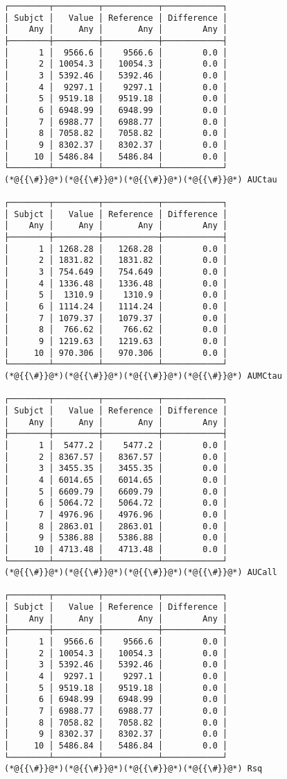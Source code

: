 \documentclass[12pt,a4paper]{article}
\begin{document}
\begin{lstlisting}
┌────────┬─────────┬───────────┬────────────┐
│ Subjct │   Value │ Reference │ Difference │
│    Any │     Any │       Any │        Any │
├────────┼─────────┼───────────┼────────────┤
│      1 │  9566.6 │    9566.6 │        0.0 │
│      2 │ 10054.3 │   10054.3 │        0.0 │
│      3 │ 5392.46 │   5392.46 │        0.0 │
│      4 │  9297.1 │    9297.1 │        0.0 │
│      5 │ 9519.18 │   9519.18 │        0.0 │
│      6 │ 6948.99 │   6948.99 │        0.0 │
│      7 │ 6988.77 │   6988.77 │        0.0 │
│      8 │ 7058.82 │   7058.82 │        0.0 │
│      9 │ 8302.37 │   8302.37 │        0.0 │
│     10 │ 5486.84 │   5486.84 │        0.0 │
└────────┴─────────┴───────────┴────────────┘
(*@{{\#}}@*)(*@{{\#}}@*)(*@{{\#}}@*)(*@{{\#}}@*) AUCtau

┌────────┬─────────┬───────────┬────────────┐
│ Subjct │   Value │ Reference │ Difference │
│    Any │     Any │       Any │        Any │
├────────┼─────────┼───────────┼────────────┤
│      1 │ 1268.28 │   1268.28 │        0.0 │
│      2 │ 1831.82 │   1831.82 │        0.0 │
│      3 │ 754.649 │   754.649 │        0.0 │
│      4 │ 1336.48 │   1336.48 │        0.0 │
│      5 │  1310.9 │    1310.9 │        0.0 │
│      6 │ 1114.24 │   1114.24 │        0.0 │
│      7 │ 1079.37 │   1079.37 │        0.0 │
│      8 │  766.62 │    766.62 │        0.0 │
│      9 │ 1219.63 │   1219.63 │        0.0 │
│     10 │ 970.306 │   970.306 │        0.0 │
└────────┴─────────┴───────────┴────────────┘
(*@{{\#}}@*)(*@{{\#}}@*)(*@{{\#}}@*)(*@{{\#}}@*) AUMCtau

┌────────┬─────────┬───────────┬────────────┐
│ Subjct │   Value │ Reference │ Difference │
│    Any │     Any │       Any │        Any │
├────────┼─────────┼───────────┼────────────┤
│      1 │  5477.2 │    5477.2 │        0.0 │
│      2 │ 8367.57 │   8367.57 │        0.0 │
│      3 │ 3455.35 │   3455.35 │        0.0 │
│      4 │ 6014.65 │   6014.65 │        0.0 │
│      5 │ 6609.79 │   6609.79 │        0.0 │
│      6 │ 5064.72 │   5064.72 │        0.0 │
│      7 │ 4976.96 │   4976.96 │        0.0 │
│      8 │ 2863.01 │   2863.01 │        0.0 │
│      9 │ 5386.88 │   5386.88 │        0.0 │
│     10 │ 4713.48 │   4713.48 │        0.0 │
└────────┴─────────┴───────────┴────────────┘
(*@{{\#}}@*)(*@{{\#}}@*)(*@{{\#}}@*)(*@{{\#}}@*) AUCall

┌────────┬─────────┬───────────┬────────────┐
│ Subjct │   Value │ Reference │ Difference │
│    Any │     Any │       Any │        Any │
├────────┼─────────┼───────────┼────────────┤
│      1 │  9566.6 │    9566.6 │        0.0 │
│      2 │ 10054.3 │   10054.3 │        0.0 │
│      3 │ 5392.46 │   5392.46 │        0.0 │
│      4 │  9297.1 │    9297.1 │        0.0 │
│      5 │ 9519.18 │   9519.18 │        0.0 │
│      6 │ 6948.99 │   6948.99 │        0.0 │
│      7 │ 6988.77 │   6988.77 │        0.0 │
│      8 │ 7058.82 │   7058.82 │        0.0 │
│      9 │ 8302.37 │   8302.37 │        0.0 │
│     10 │ 5486.84 │   5486.84 │        0.0 │
└────────┴─────────┴───────────┴────────────┘
(*@{{\#}}@*)(*@{{\#}}@*)(*@{{\#}}@*)(*@{{\#}}@*) Rsq


\end{lstlisting}
\end{document}
